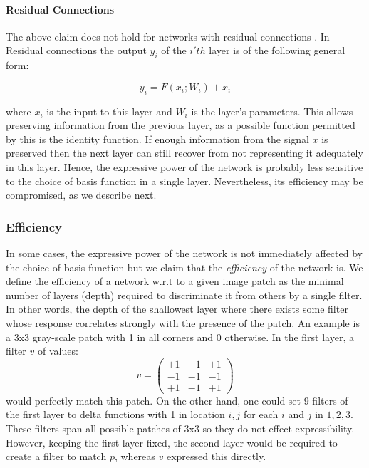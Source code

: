 \documentclass[10pt,journal,compsoc]{IEEEtran}
\begin{document}
\paragraph{Residual Connections}

The above claim does not hold for networks with residual connections
\cite{he2016deep}. In Residual connections the output $y_{i}$ of
the $i'th$ layer is of the following general form:

\begin{equation}
y_{i}=F(x_{i};W_{i})+x_{i}
\end{equation}

where $x_{i}$ is the input to this layer and $W_{i}$ is the layer's
parameters. This allows preserving information from the previous layer,
as a possible function permitted by this is the identity function.
If enough information from the signal $x$ is preserved then the next
layer can still recover from not representing it adequately in this
layer. Hence, the expressive power of the network is probably less
sensitive to the choice of basis function in a single layer. Nevertheless,
its efficiency may be compromised, as we describe next. 

\subsubsection{Efficiency}

In some cases, the expressive power of the network is not immediately
affected by the choice of basis function but we claim that the \emph{efficiency
}of the network is. We define the efficiency of a network w.r.t to
a given image patch as the minimal number of layers (depth) required
to discriminate it from others by a single filter. In other words,
the depth of the shallowest layer where there exists some filter whose
response correlates strongly with the presence of the patch. An example
is a 3x3 gray-scale patch with 1 in all corners and 0 otherwise. In
the first layer, a filter $v$ of values: 
\[
v=\left(\begin{array}{ccc}
+1 & -1 & +1\\
-1 & -1 & -1\\
+1 & -1 & +1
\end{array}\right)
\]
 would perfectly match this patch. On the other hand, one could set
9 filters of the first layer to delta functions with 1 in location
$i,j$ for each $i$ and $j$ in ${\ensuremath{{1,2,3}}}.$ These
filters span all possible patches of 3x3 so they do not effect expressibility.
However, keeping the first layer fixed, the second layer would be
required to create a filter to match $p$, whereas $v$ expressed
this directly. 
\end{document}

